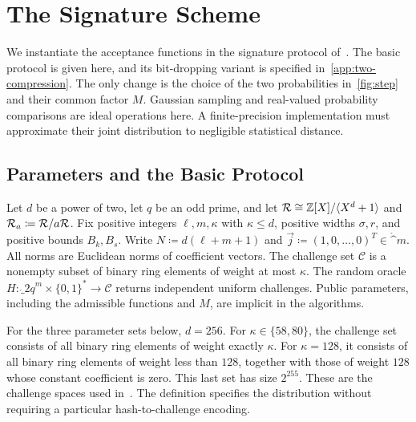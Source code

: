 \section{The Signature Scheme}
\label{sec:protocol}

We instantiate the acceptance functions in the signature protocol of~\cite{GartnerFull}. The basic protocol is given here, and its bit-dropping variant is specified in~\cref{app:two-compression}. The only change is the choice of the two probabilities in~\cref{fig:step} and their common factor $M$. Gaussian sampling and real-valued probability comparisons are ideal operations here. A finite-precision implementation must approximate their joint distribution to negligible statistical distance.

\subsection{Parameters and the Basic Protocol}

\begin{definition}
\label{def:parameters}
Let $d$ be a power of two, let $q$ be an odd prime, and let $\mathcal{R}\cong\mathbb{Z}[X]/\langle X^d+1\rangle$ and $\mathcal{R}_a\coloneqq\mathcal{R}/a\mathcal{R}$. Fix positive integers $\ell,m,\kappa$ with $\kappa\le d$, positive widths $\sigma,r$, and positive bounds $B_k,B_s$. Write $N\coloneqq d(\ell+m+1)$ and $\vec j\coloneqq(1,0,\ldots,0)^T\in\ring^m$. All norms are Euclidean norms of coefficient vectors. The challenge set $\mathcal C$ is a nonempty subset of binary ring elements of weight at most $\kappa$. The random oracle $H\colon\ring_{2q}^m\times\{0,1\}^*\to\mathcal C$ returns independent uniform challenges. Public parameters, including the admissible functions and $M$, are implicit in the algorithms.
\end{definition}

For the three parameter sets below, $d=256$. For $\kappa\in\{58,80\}$, the challenge set consists of all binary ring elements of weight exactly $\kappa$. For $\kappa=128$, it consists of all binary ring elements of weight less than $128$, together with those of weight $128$ whose constant coefficient is zero. This last set has size $2^{255}$. These are the challenge spaces used in~\cite{GartnerFull,TCHES:CCDGHK24}. The definition specifies the distribution without requiring a particular hash-to-challenge encoding.

